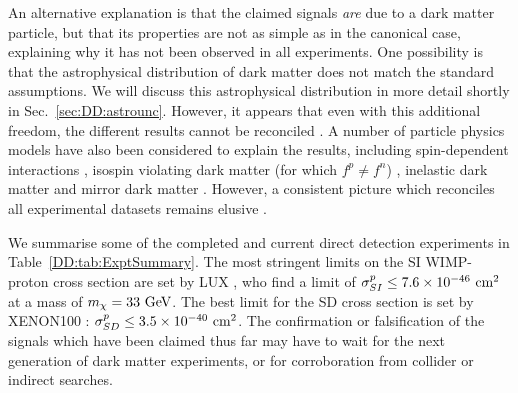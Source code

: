 An alternative explanation is that the claimed signals \textit{are} due to a dark matter particle, but that its properties are not as simple as in the canonical case, explaining why it has not been observed in all experiments. One possibility is that the astrophysical distribution of dark matter does not match the standard assumptions. We will discuss this astrophysical distribution in more detail shortly in Sec.~\ref{sec:DD:astrounc}. However, it appears that even with this additional freedom, the different results cannot be reconciled \cite{Fairbairn:2009,Herrero-Garcia:2012,Fox:2011b,Frandsen:2012}. A number of particle physics models have also been considered to explain the results, including spin-dependent interactions \cite{Buckley:2013}, isospin violating dark matter (for which $f^p \neq f^n$) \cite{Feng:2011}, inelastic dark matter \cite{Smith:2001} and mirror dark matter \cite{Foot:2013}. However, a consistent picture which reconciles all experimental datasets remains elusive \cite{Schwetz:2011}. %

We summarise some of the completed and current direct detection experiments in Table~\ref{DD:tab:ExptSummary}. The most stringent limits on the SI WIMP-proton cross section are set by LUX \cite{Akerib:2014}, who find a limit of $\sigma_{SI}^p \leq 7.6 \times 10^{-46} \textrm{ cm}^2$ at a mass of $m_\chi = 33 \textrm{ GeV}$. The best limit for the SD cross section is set by XENON100 \cite{Aprile:2013c}: $\sigma_{SD}^p \leq 3.5 \times 10^{-40} \textrm{ cm}^2$. The confirmation or falsification of the signals which have been claimed thus far may have to wait for the next generation of dark matter experiments, or for corroboration from collider or indirect searches.


